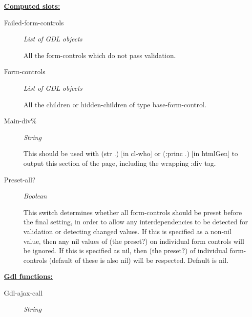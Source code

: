 \documentclass [11pt]{book}
\begin{document}
\begin{itemize}
\begin{description}
\end{description}






\textbf{
\underline{Computed slots:}}

\begin{description}

\item [Failed-form-controls]
\emph{List of GDL objects}

 All the form-controls which do not pass validation.




\item [Form-controls]
\emph{List of GDL objects}

 All the children or hidden-children
of type base-form-control.




\item [Main-div\%]
\emph{String}

 This should be used with (str .) [in cl-who] or (:princ .)
[in htmlGen] to output this section of the page, including the wrapping :div tag.




\item [Preset-all?]
\emph{Boolean}

 This switch determines whether all form-controls should be preset
before the final setting, in order to allow any interdependencies to be detected
for validation or detecting changed values. If this is specified as a non-nil
value, then any nil values of (the preset?) on individual form controls will be
ignored. If this is specified as nil, then (the preset?) of individual
form-controls (default of these is also nil) will be respected. Default is nil.




\end{description}






\textbf{
\underline{Gdl functions:}}

\begin{description}

\item [Gdl-ajax-call]
\emph{String}


\end{description}
\end{itemize}
\end{document}
